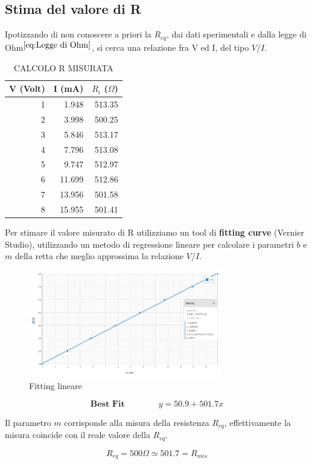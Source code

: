 \documentclass{article}
\begin{document}
		
		\subsection{Stima del valore di R}
		Ipotizzando di non conoscere a priori la $R_{eq}$, dai dati sperimentali e dalla legge di Ohm$^{\ref{eq:Legge di Ohm}}$, si cerca una relazione fra V ed I, del tipo $V/I$.
		
		
			\begin{table}[h]
				\centering
				\captionsetup{skip=10pt} %
				\caption{CALCOLO R MISURATA}
				\label{tab:calcolo_resistenze}
				\begin{tabular}{r|r|r}
					V (Volt) & I (mA) & $R_i$ ($\Omega$) \\ \hline
					1        & 1.948  & 513.35          \\ \hline
					2        & 3.998  & 500.25          \\ \hline
					3        & 5.846  & 513.17          \\ \hline
					4        & 7.796  & 513.08          \\ \hline
					5        & 9.747  & 512.97          \\ \hline
					6        & 11.699 & 512.86          \\ \hline
					7        & 13.956 & 501.58          \\ \hline
					8        & 15.955 & 501.41         
				\end{tabular}
			\end{table}
		
		Per stimare il valore misurato di R utilizziamo un tool di \textbf{fitting curve} (Vernier Studio), utilizzando un metodo di regressione lineare per calcolare i parametri $b$ e $m$ della retta che meglio approssima la relazione $V/I$.
		
		\begin{figure}[h]
			\centering
			\includegraphics[width=0.75\textwidth]{Graficodiohm.png} %
			\caption{Fitting lineare}
			\label{fig:Grafico}
		\end{figure}
		
		\begin{equation}
			\textbf{Best Fit} \quad\quad\quad\quad	y = 50.9 + 501.7x
		\end{equation}
		
		Il parametro $m$ corrisponde alla misura della resistenza $R_{eq}$, effettivamente la misura coincide con il reale valore della $R_{eq}$.
		
		\begin{equation}
			R_{eq} = 500\Omega \simeq 501.7 = R_{mis}
		\end{equation}
	
	
\end{document}
